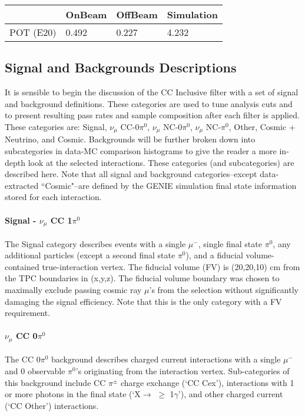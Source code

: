 \begin{table}[H] 
 \centering
 \begin{tabular}{| l | l | l | l |}
  \hline
   & OnBeam & OffBeam & Simulation \\ [0.1ex] \hline
POT (E20) & 0.492 & 0.227 & 4.232 \\ \hline
 \end{tabular}
\end{table}

\subsection{Signal and Backgrounds Descriptions}
\par It is sensible to begin the discussion of the CC Inclusive filter with a set of signal and background definitions.  These categories are used to tune analysis cuts and to present resulting pass rates and sample composition after each filter is applied.  These categories are: Signal, $\nu_\mu$ CC-0$\pi^0$, $\nu_\mu$ NC-0$\pi^0$, $\nu_\mu$ NC-$\pi^0$, Other, Cosmic + Neutrino, and Cosmic. Backgrounds will be further broken down into subcategories in data-MC comparison histograms to give the reader a more in-depth look at the selected interactions.  These categories (and subcategories) are described here. Note that all signal and background categories--except data-extracted ``Cosmic"--are defined by the GENIE simulation final state information stored for each interaction.

\paragraph{Signal - $\nu_\mu$ CC 1$\pi^0$} The Signal category describes events with a single $\mu^-$, single final state $\pi^0$, any additional particles (except a second final state $\pi^0$), and a fiducial volume-contained true-interaction vertex. The fiducial volume (FV) is (20,20,10) cm from the TPC boundaries in (x,y,z). The fiducial volume boundary was chosen to maximally exclude passing cosmic ray $\mu$'s from the selection without significantly damaging the signal efficiency. Note that this is the only category with a FV requirement.

\paragraph{ $\nu_\mu$ CC 0$\pi^0$}
The CC 0$\pi^0$ background describes charged current interactions with a single $\mu^-$ and 0 observable $\pi^0$'s originating from the interaction vertex.  Sub-categories of this background include CC $\pi^{\pm}$ charge exchange (`CC Cex'), interactions with 1 or more photons in the final state (`X$\rightarrow$ $\geq$ 1$\gamma$'), and other charged current (`CC Other') interactions. 

